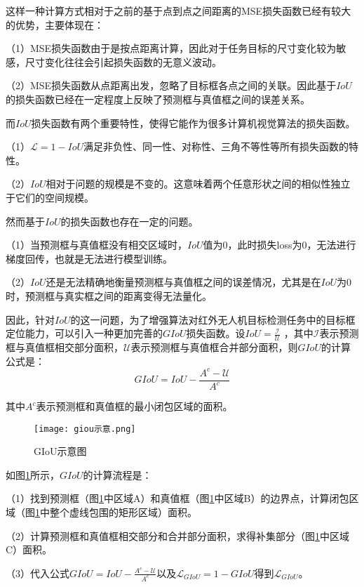 这样一种计算方式相对于之前的基于点到点之间距离的MSE损失函数已经有较大的优势，主要体现在：

（1）MSE损失函数由于是按点距离计算，因此对于任务目标的尺寸变化较为敏感，尺寸变化往往会引起损失函数的无意义波动。

（2）MSE损失函数从点距离出发，忽略了目标框各点之间的关联。因此基于$IoU$的损失函数已经在一定程度上反映了预测框与真值框之间的误差关系。

而$IoU$损失函数有两个重要特性，使得它能作为很多计算机视觉算法的损失函数。

（1）$\mathcal{L}=1-IoU$满足非负性、同一性、对称性、三角不等性等所有损失函数的特性。

（2）$IoU$相对于问题的规模是不变的。这意味着两个任意形状之间的相似性独立于它们的空间规模。

然而基于$IoU$的损失函数也存在一定的问题。

（1）当预测框与真值框没有相交区域时，$IoU$值为0，此时损失loss为0，无法进行梯度回传，也就是无法进行模型训练。

（2）$IoU$还是无法精确地衡量预测框与真值框之间的误差情况，尤其是在$IoU$为0时，预测框与真实框之间的距离变得无法量化。

因此，针对$IoU$的这一问题，为了增强算法对红外无人机目标检测任务中的目标框定位能力，可以引入一种更加完善的$GIoU$损失函数。设$I o U=\frac{\mathcal{I}}{\mathcal{U}}$
，其中$\mathcal{I}$表示预测框与真值框相交部分面积，$\mathcal{U}$表示预测框与真值框合并部分面积，则$GIoU$的计算公式是：
\begin{equation}
  G I o U=I o U-\frac{A^{c}-\mathcal{U}}{A^{c}}
\end{equation}

其中$A^{c}$表示预测框和真值框的最小闭包区域的面积。

\begin{figure}[htbp]
  \centering
  \texttt{[image: giou示意.png]}
  \caption{GIoU示意图}
  \label{gi}
\end{figure}

如图\ref{gi}所示，$GIoU$的计算流程是：

（1）找到预测框（图\ref{gi}中区域A）和真值框（图\ref{gi}中区域B）的边界点，计算闭包区域（图\ref{gi}中整个虚线包围的矩形区域）面积。

（2）计算预测框和真值框相交部分和合并部分面积，求得补集部分（图\ref{gi}中区域C）面积。

（3）代入公式$G I o U=I o U-\frac{A^{c}-\mathcal{U}}{A^{c}}$以及$\mathcal{L}_{G I o U}=1-G I o U$得到$\mathcal{L}_{G I o U}$。

